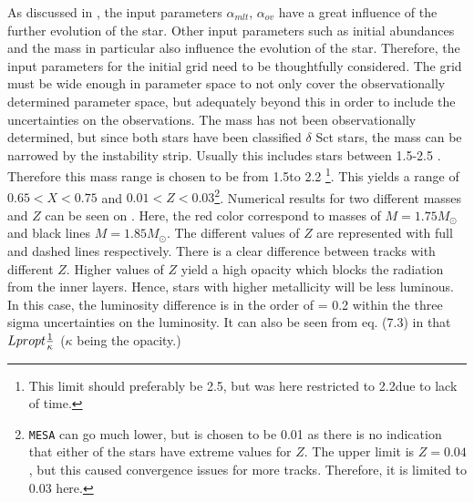 As discussed in , the input parameters $\alpha_{mlt}$, $\alpha_{ov}$ have a great influence of the further evolution of the star. Other input parameters such as initial abundances and the mass in particular also influence the evolution of the star. Therefore, the input parameters for the initial grid need to be thoughtfully considered.  The grid must be wide enough in parameter space to not only cover the observationally determined parameter space, but adequately beyond this in order to include the uncertainties on the observations.
The mass has not been observationally determined, but since both stars have been classified $\delta$ Sct stars, the mass can be narrowed by the instability strip. Usually this includes stars between 1.5-2.5 \msun. Therefore this mass range is chosen to be from 1.5\msun to 2.2 \msun\footnote{This limit should preferably be 2.5\msun, but was here restricted to 2.2\msun due to lack of time.}. This yields a range of $0.65<X<0.75$ and $0.01<Z<0.03$\footnote{\texttt{MESA} can go much lower, but is chosen to be 0.01 as there is no indication that either of the stars have extreme values for $Z$. The upper limit is $Z= 0.04$, but this caused convergence issues for more tracks. Therefore, it is limited to 0.03 here.}. Numerical results for two different masses and $Z$ can be seen on . Here, the red color correspond to masses of $M=1.75M_\odot$ and black lines $M=1.85M_\odot$. The different values of $Z$ are represented with full and dashed lines respectively. There is a clear difference between tracks with different $Z$. Higher values of $Z$ yield a high opacity which blocks the radiation from the inner layers. Hence, stars with higher metallicity will be less luminous. In this case, the luminosity difference is in the order of \lum = 0.2 within the three sigma uncertainties on the luminosity.  It can also be seen from eq. (7.3) in \citet{christensen2008lecture} that $L \\propt \frac{1}{\kappa}$ ($\kappa$ being the opacity.)


